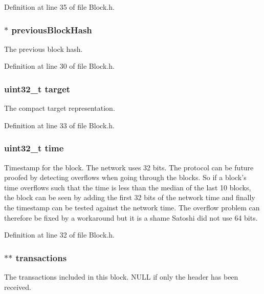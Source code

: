 Definition at line 35 of file Block.h.

\hypertarget{struct_block_ac5cb79d8f66809a5f75592e22db9be2c}{
\subsubsection[{previousBlockHash}]{$\ast$ {\bf previousBlockHash}}}
\label{struct_block_ac5cb79d8f66809a5f75592e22db9be2c}
The previous block hash. 

Definition at line 30 of file Block.h.

\hypertarget{struct_block_a695e5800ad1fd403c0e72d918eaec97c}{
\subsubsection[{target}]{\setlength{\rightskip}{0pt plus 5cm}uint32\_\-t {\bf target}}}
\label{struct_block_a695e5800ad1fd403c0e72d918eaec97c}
The compact target representation. 

Definition at line 33 of file Block.h.

\hypertarget{struct_block_ae73654f333e4363463ad8c594eca1905}{
\subsubsection[{time}]{\setlength{\rightskip}{0pt plus 5cm}uint32\_\-t {\bf time}}}
\label{struct_block_ae73654f333e4363463ad8c594eca1905}
Timestamp for the block. The network uses 32 bits. The protocol can be future proofed by detecting overflows when going through the blocks. So if a block's time overflows such that the time is less than the median of the last 10 blocks, the block can be seen by adding the first 32 bits of the network time and finally the timestamp can be tested against the network time. The overflow problem can therefore be fixed by a workaround but it is a shame Satoshi did not use 64 bits. 

Definition at line 32 of file Block.h.

\hypertarget{struct_block_acf585c1809511c4f5b5366bb2bc2e855}{
\subsubsection[{transactions}]{$\ast$$\ast$ {\bf transactions}}}
\label{struct_block_acf585c1809511c4f5b5366bb2bc2e855}
The transactions included in this block. NULL if only the header has been received. 

